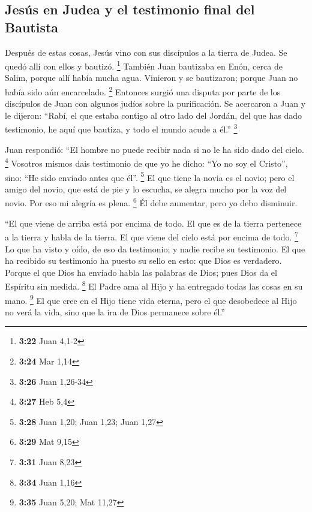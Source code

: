 \hypertarget{jesuxfas-en-judea-y-el-testimonio-final-del-bautista}{%
\subsection{Jesús en Judea y el testimonio final del
Bautista}\label{jesuxfas-en-judea-y-el-testimonio-final-del-bautista}}

 Después de estas cosas, Jesús vino con sus discípulos a
la tierra de Judea. Se quedó allí con ellos y bautizó. \footnote{\textbf{3:22}
  Juan 4,1-2}  También Juan bautizaba en Enón, cerca de
Salim, porque allí había mucha agua. Vinieron y se bautizaron;
 porque Juan no había sido aún encarcelado. \footnote{\textbf{3:24}
  Mar 1,14}  Entonces surgió una disputa por parte de los
discípulos de Juan con algunos judíos sobre la purificación.
 Se acercaron a Juan y le dijeron: ``Rabí, el que estaba
contigo al otro lado del Jordán, del que has dado testimonio, he aquí
que bautiza, y todo el mundo acude a él.'' \footnote{\textbf{3:26} Juan
  1,26-34}

 Juan respondió: ``El hombre no puede recibir nada si no
le ha sido dado del cielo. \footnote{\textbf{3:27} Heb 5,4}
 Vosotros mismos dais testimonio de que yo he dicho: ``Yo
no soy el Cristo'', sino: ``He sido enviado antes que él''. \footnote{\textbf{3:28}
  Juan 1,20; Juan 1,23; Juan 1,27}  El que tiene la novia
es el novio; pero el amigo del novio, que está de pie y lo escucha, se
alegra mucho por la voz del novio. Por eso mi alegría es plena.
\footnote{\textbf{3:29} Mat 9,15}  Él debe aumentar, pero
yo debo disminuir.

 ``El que viene de arriba está por encima de todo. El que
es de la tierra pertenece a la tierra y habla de la tierra. El que viene
del cielo está por encima de todo. \footnote{\textbf{3:31} Juan 8,23}
 Lo que ha visto y oído, de eso da testimonio; y nadie
recibe su testimonio.  El que ha recibido su testimonio
ha puesto su sello en esto: que Dios es verdadero. 
Porque el que Dios ha enviado habla las palabras de Dios; pues Dios da
el Espíritu sin medida. \footnote{\textbf{3:34} Juan 1,16}
 El Padre ama al Hijo y ha entregado todas las cosas en
su mano. \footnote{\textbf{3:35} Juan 5,20; Mat 11,27} 
El que cree en el Hijo tiene vida eterna, pero el que desobedece al Hijo
no verá la vida, sino que la ira de Dios permanece sobre él.''

